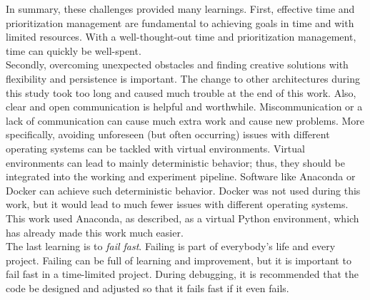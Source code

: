 		In summary, these challenges provided many learnings. First, effective time and prioritization management are fundamental to achieving goals in time and with limited resources. With a well-thought-out time and prioritization management, time can quickly be well-spent.\\
		Secondly, overcoming unexpected obstacles and finding creative solutions with flexibility and persistence is important. The change to other architectures during this study took too long and caused much trouble at the end of this work. Also, clear and open communication is helpful and worthwhile. Miscommunication or a lack of communication can cause much extra work and cause new problems. 
		More specifically, avoiding unforeseen (but often occurring) issues with different operating systems can be tackled with virtual environments. Virtual environments can lead to mainly deterministic behavior; thus, they should be integrated into the working and experiment pipeline. Software like Anaconda or Docker can achieve such deterministic behavior. Docker was not used during this work, but it would lead to much fewer issues with different operating systems. This work used Anaconda, as described, as a virtual Python environment, which has already made this work much easier.\\
		The last learning is to \textit{fail fast}. Failing is part of everybody's life and every project. Failing can be full of learning and improvement, but it is important to fail fast in a time-limited project. During debugging, it is recommended that the code be designed and adjusted so that it fails fast if it even fails.
		
		
	
	
	
	
	
	


